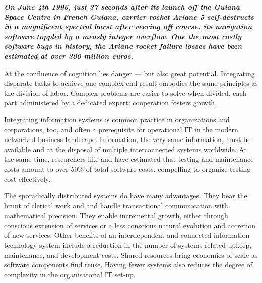 \documentclass[12pt,a4paper,oneside,pdftex]{report}
\begin{document}
\begin{adjustwidth}{2.5em}{0pt}
\small
\textbf{\emph{On June 4th 1996, just 37 seconds after its launch off the Guiana Space Centre in French Guiana, carrier rocket Ariane 5 self-destructs in a magnificent spectral burst after veering off course, its navigation software toppled by a measly integer overflow. One the most costly software bugs in history, the Ariane rocket failure losses have been estimated at over 300 million euros. \citep{dowson1997ariane}}}
\normal
\end{adjustwidth}
\vspace{8 mm}

At the confluence of cognition lies danger --- but also great potential. Integrating disparate tasks to achieve one complex end result embodies the same principles as the division of labor. Complex problems are easier to solve when divided, each part administered by a dedicated expert; cooperation fosters growth.

Integrating information systems is common practice in organizations and corporations, too, and often a prerequisite for operational IT in the modern networked business landscape. Information, the very same information, must be available and at the disposal of multiple interconnected systems worldwide. At the same time, researchers like \citet{myers1976software} and \citet{reid1976} have estimated that testing and maintenance costs amount to over 50\% of total software costs, compelling to organize testing cost-effectively.

The sporadically distributed systems do have many advantages. They bear the brunt of clerical work and and handle transactional communication with mathematical precision. They enable incremental growth, either through conscious extension of services or a less conscious natural evolution and accretion of new services. Other benefits of an interdependent and connected information technology system include a reduction in the number of systems related upkeep, maintenance, and development costs. Shared resources bring economies of scale as software components find reuse. \citep{rehman2007testing} Having fewer systems also reduces the degree of complexity in the organisatorial IT set-up.
\end{document}
